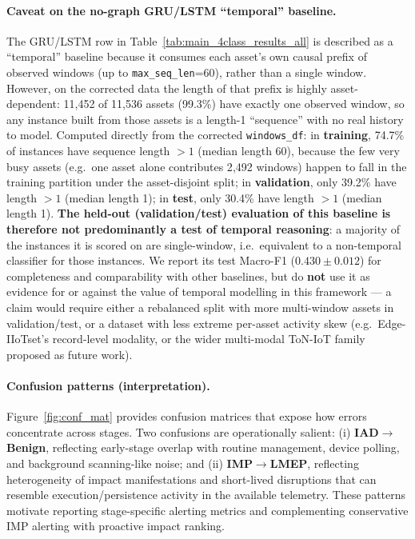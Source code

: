 \documentclass[pdflatex,sn-mathphys-num]{sn-jnl}
\theoremstyle{thmstyleone}%
\theoremstyle{thmstyletwo}%
\theoremstyle{thmstylethree}%
\begin{document}
\paragraph{Caveat on the no-graph GRU/LSTM ``temporal'' baseline.}
\label{sec:grutemporal_caveat}
The GRU/LSTM row in Table~\ref{tab:main_4class_results_all} is described as a ``temporal'' baseline because it consumes each asset's own causal prefix of observed windows (up to \texttt{max\_seq\_len}=60), rather than a single window. However, on the corrected data the length of that prefix is highly asset-dependent: 11,452 of 11,536 assets (99.3\%) have exactly one observed window, so any instance built from those assets is a length-1 ``sequence'' with no real history to model. Computed directly from the corrected \texttt{windows\_df}: in \textbf{training}, 74.7\% of instances have sequence length $>1$ (median length 60), because the few very busy assets (e.g.\ one asset alone contributes 2{,}492 windows) happen to fall in the training partition under the asset-disjoint split; in \textbf{validation}, only 39.2\% have length $>1$ (median length 1); in \textbf{test}, only 30.4\% have length $>1$ (median length 1). \textbf{The held-out (validation/test) evaluation of this baseline is therefore not predominantly a test of temporal reasoning}: a majority of the instances it is scored on are single-window, i.e.\ equivalent to a non-temporal classifier for those instances. We report its test Macro-F1 ($0.430\pm0.012$) for completeness and comparability with other baselines, but do \textbf{not} use it as evidence for or against the value of temporal modelling in this framework --- a claim would require either a rebalanced split with more multi-window assets in validation/test, or a dataset with less extreme per-asset activity skew (e.g.\ Edge-IIoTset's record-level modality, or the wider multi-modal ToN-IoT family proposed as future work).

\paragraph{Confusion patterns (interpretation).}
Figure~\ref{fig:conf_mat} provides confusion matrices that expose how errors concentrate across stages.
Two confusions are operationally salient: (i) \textbf{IAD$\rightarrow$Benign}, reflecting early-stage overlap with routine management, device polling, and background scanning-like noise; and (ii) \textbf{IMP$\rightarrow$LMEP}, reflecting heterogeneity of impact manifestations and short-lived disruptions that can resemble execution/persistence activity in the available telemetry.
These patterns motivate reporting stage-specific alerting metrics and complementing conservative IMP alerting with proactive impact ranking.
\end{document}
